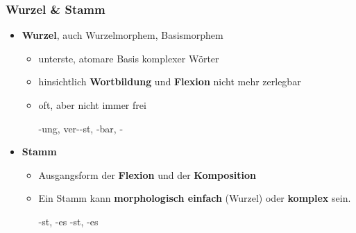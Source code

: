 \begin{frame}
\frametitle{Wurzel \& Stamm}

\begin{itemize}
	\item \textbf{Wurzel}, auch Wurzelmorphem, Basismorphem \citep[vgl.][]{Eins16d}
	
	\begin{itemize}
		\item unterste, atomare Basis komplexer Wörter
		\item hinsichtlich \textbf{Wortbildung} und \textbf{Flexion} nicht mehr zerlegbar
		\item oft, aber nicht immer frei
		
		\ea {}-ung, ver--st, -bar, -				
		\z 
	\end{itemize}


	\item \textbf{Stamm} \citep[vgl.][]{Eins16c}
	
	\begin{itemize}
		\item Ausgangsform der \textbf{Flexion} und der \textbf{Komposition}
		\item Ein Stamm kann \textbf{morphologisch einfach} (Wurzel) oder \textbf{komplex} sein.
	
		\ea 
			\ea {}-st, -es
			\ex {}-st, -es
			\z 
		\z 
	\end{itemize}
\end{itemize}

\end{frame}


